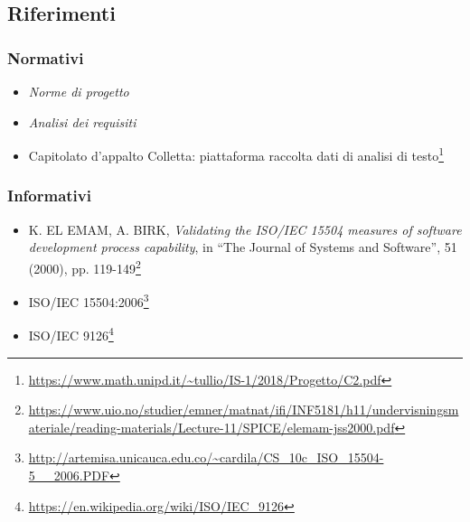 \subsection{Riferimenti}
\subsubsection{Normativi}
\begin{itemize}
\item \textit{Norme di progetto}
\item \textit{Analisi dei requisiti}
\item Capitolato d'appalto Colletta: piattaforma raccolta dati di analisi di testo\footnote{\url{https://www.math.unipd.it/~tullio/IS-1/2018/Progetto/C2.pdf}}
\end{itemize}
\subsubsection{Informativi}
\begin{itemize}
	\item K. EL EMAM, A. BIRK, \textit{Validating the ISO/IEC 15504 measures of software development process capability}, in \enquote{The Journal of Systems and Software}, 51 (2000), pp. 119-149\footnote{\url{https://www.uio.no/studier/emner/matnat/ifi/INF5181/h11/undervisningsmateriale/reading-materials/Lecture-11/SPICE/elemam-jss2000.pdf}}
	\item ISO/IEC 15504:2006\footnote{\url{http://artemisa.unicauca.edu.co/~cardila/CS\_10c\_ISO\_15504-5\_\_2006.PDF}}
	\item ISO/IEC 9126\footnote{\url{https://en.wikipedia.org/wiki/ISO/IEC_9126}}
\end{itemize} 
